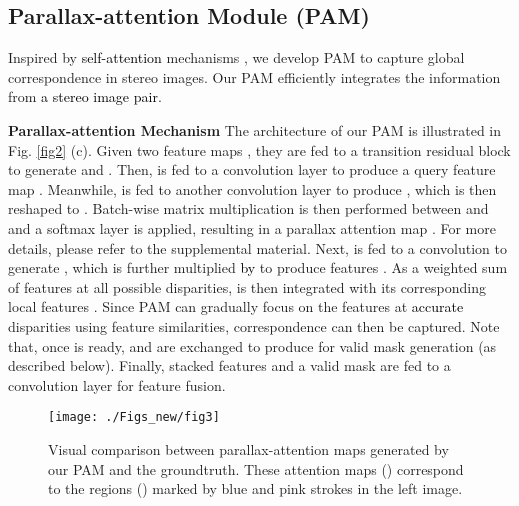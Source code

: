 \documentclass[10pt,twocolumn,letterpaper]{article}
\begin{document}
\subsection{Parallax-attention Module (PAM)}
\label{sec3.2}
Inspired by \textcolor{black}{self-attention} mechanisms \cite{2018-SelfAttentionGenerativeAdversarialNetworks-Zhang--,2018-DualAttentionNetworkforSceneSegmentation-Fu--}, we develop PAM to capture global correspondence in stereo images. Our PAM efficiently integrates the information from \textcolor{black}{a stereo image pair}.


\noindent
\textbf{Parallax-attention Mechanism}
The architecture of our PAM is illustrated in Fig. \ref{fig2} (c). Given two feature maps , they are fed to a transition residual block to generate  and . Then,  is fed to a  convolution layer to produce a query feature map . 
Meanwhile,  is fed to another  convolution layer to produce  , which is then reshaped to . Batch-wise matrix multiplication is then performed between  and  and a softmax layer is applied, resulting in a parallax attention map . For more details, please refer to the supplemental material. Next,  is fed to a  convolution to generate , which is further multiplied \textcolor{black}{by}  to produce features . As a weighted sum of features at all possible disparities,  is  then integrated with its corresponding local features . Since PAM can gradually focus on the features at \textcolor{black}{accurate} disparities using feature similarities, correspondence can then be captured. Note that, once  is ready,  and  are exchanged to produce   for valid mask generation (as described below). Finally, stacked features and a valid mask  are fed to a  convolution layer for feature fusion.

\begin{figure}[tp]
	\centering
	\texttt{[image: ./Figs\_new/fig3]}
	\caption{Visual comparison between parallax-attention maps  generated by our PAM and the groundtruth. These attention maps () correspond to the regions () marked by blue and pink strokes in the left image.}
	\label{fig5}
\end{figure}
\end{document}
